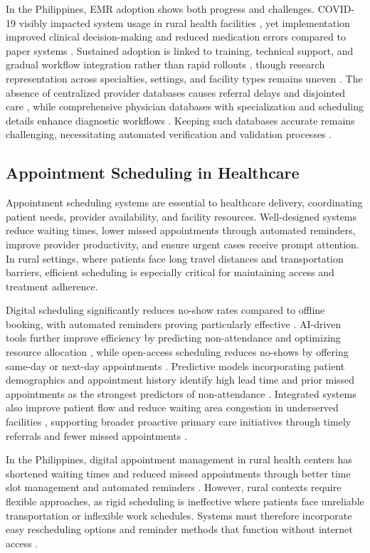 \documentclass[12pt]{report}
\begin{document}
In the Philippines, EMR adoption shows both progress and challenges. COVID-19
visibly impacted system usage in rural health facilities \cite{ref2}, yet
implementation improved clinical decision-making and reduced medication errors
compared to paper systems \cite{ref40}. Sustained adoption is linked to
training, technical support, and gradual workflow integration rather than rapid
rollouts \cite{ref28}, though research representation across specialties,
settings, and facility types remains uneven \cite{ref14}. The absence of
centralized provider databases causes referral delays and disjointed care
\cite{ref60}, while comprehensive physician databases with specialization and
scheduling details enhance diagnostic workflows \cite{ref53}. Keeping such
databases accurate remains challenging, necessitating automated verification
and validation processes \cite{ref35}.

\subsection*{Appointment Scheduling in Healthcare}

Appointment scheduling systems are essential to healthcare delivery,
coordinating patient needs, provider availability, and facility resources.
Well-designed systems reduce waiting times, lower missed appointments through
automated reminders, improve provider productivity, and ensure urgent cases
receive prompt attention. In rural settings, where patients face long travel
distances and transportation barriers, efficient scheduling is especially
critical for maintaining access and treatment adherence.

Digital scheduling significantly reduces no-show rates compared to offline
booking, with automated reminders proving particularly effective \cite{ref45}.
AI-driven tools further improve efficiency by predicting non-attendance and
optimizing resource allocation \cite{ref56}, while open-access scheduling
reduces no-shows by offering same-day or next-day appointments \cite{ref26}.
Predictive models incorporating patient demographics and appointment history
identify high lead time and prior missed appointments as the strongest
predictors of non-attendance \cite{ref17, ref13}. Integrated systems also
improve patient flow and reduce waiting area congestion in underserved
facilities \cite{ref65}, supporting broader proactive primary care initiatives
through timely referrals and fewer missed appointments \cite{ref11, ref35}.

In the Philippines, digital appointment management in rural health centers has
shortened waiting times and reduced missed appointments through better time
slot management and automated reminders \cite{ref50}. However, rural contexts
require flexible approaches, as rigid scheduling is ineffective where patients
face unreliable transportation or inflexible work schedules. Systems must
therefore incorporate easy rescheduling options and reminder methods that
function without internet access \cite{ref37}.
\end{document}
